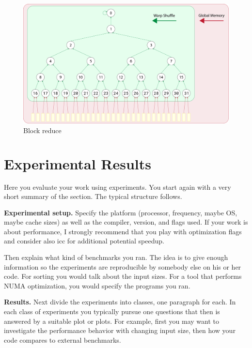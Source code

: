 \documentclass[letterpaper]{article}
\newcommand{\mypar}[1]{{\bf #1.}}
\begin{document}
\begin{figure}\centering
\includegraphics[scale=0.125]{device.pdf}
  \caption{Block reduce}
\end{figure}









\section{Experimental Results}\label{sec:exp}

Here you evaluate your work using experiments. You start again with a
very short summary of the section. The typical structure follows.

\mypar{Experimental setup} Specify the platform (processor, frequency, maybe OS, maybe cache sizes)
as well as the compiler, version, and flags used. If your work is about performance, 
I strongly recommend that you play with optimization flags and consider also icc for additional potential speedup.

Then explain what kind of benchmarks you ran. The idea is to give enough information so the experiments are reproducible by somebody else on his or her code.
For sorting you would talk about the input sizes. For a tool that performs NUMA optimization, you would specify the programs you ran.

\mypar{Results}
Next divide the experiments into classes, one paragraph for each. In each class of experiments you typically pursue one questions that then is answered by a suitable plot or plots. For example, first you may want to investigate the performance behavior with changing input size, then how your code compares to external benchmarks.
\end{document}
